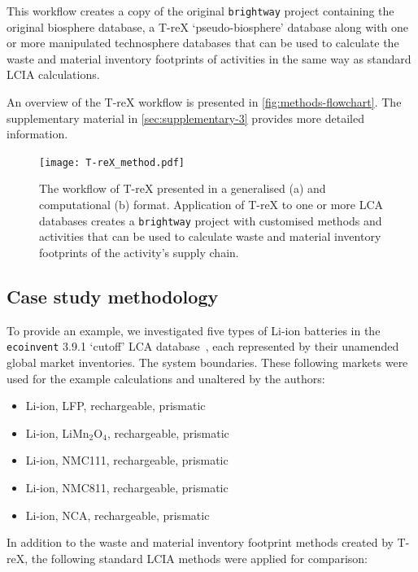 \documentclass[a4paper,fleqn]{cas-dc}
\begin{document}
	This workflow creates a copy of the original \texttt{brightway} project
	containing the original biosphere database, a T-reX `pseudo-biosphere' database
	along with one or more manipulated technosphere databases that can be used to
	calculate the waste and material inventory footprints of activities in the same
	way as standard LCIA calculations.
	
	An overview of the T-reX workflow is presented in
	\autoref{fig:methods-flowchart}. The supplementary material in
	\autoref{sec:supplementary-3} provides more detailed information.
	
	\begin{figure}[]
		\centering
		\texttt{[image: T-reX\_method.pdf]}
		\caption{The workflow of T-reX presented in a generalised (a) and computational (b) format. Application of T-reX to one or more LCA databases creates a \texttt{brightway} project with customised methods and activities that can be used to calculate waste and material inventory footprints of the activity's supply chain.}\label{fig:methods-flowchart}
	\end{figure}
	
	\subsection{Case study methodology}\label{sec:method-casestudy}
	
	To provide an example, we investigated five types of Li-ion batteries in the
	\texttt{ecoinvent} 3.9.1 `cutoff' LCA database~\citep{ecoinvent2016version3},
	each represented by their unamended global market inventories. The system
	boundaries. These following markets were used for the example calculations and
	unaltered by the authors:
	
	\begin{itemize}
		\item Li-ion, LFP, rechargeable, prismatic
		\item Li-ion, LiMn\(_2\)O\(_4\), rechargeable, prismatic
		\item Li-ion, NMC111, rechargeable, prismatic
		\item Li-ion, NMC811, rechargeable, prismatic
		\item Li-ion, NCA, rechargeable, prismatic
	\end{itemize}
	
	In addition to the waste and material inventory footprint methods created by
	T-reX, the following standard LCIA methods were applied for comparison:
	
\end{document}
